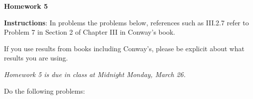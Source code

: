 \documentclass{article}%
\begin{document}
\begin{center}
\textbf{Homework 5}\bigskip
\end{center}



\noindent\textbf{Instructions}:
\noindent In problems the problems below, references such as III.2.7 refer to Problem 7 in Section 2 of Chapter III in Conway's book.\smallskip



\noindent If you use results from books including Conway's, please be explicit about what results you are using.






\begin{center}

\emph{Homework 5 is due in class at Midnight Monday, March 26.}

\end{center} 

\medskip

Do the following problems:
\end{document}
